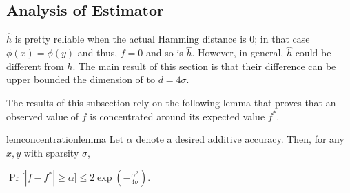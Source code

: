 \subsection{Analysis of Estimator}\label{subsec:analysis}

$\hat{h}$ is pretty reliable when the actual Hamming distance is 0; in that case 
$\phi(x)=\phi(y)$ and thus, $f=0$ and so is $\hat{h}$.
%
However, in general, $\hat{h}$ could be different from $h$. %
The main result of this section is that their difference can be upper bounded  the dimension of \fsketch to $d=4\sigma$.

The results of this subsection rely on the following lemma that proves that an observed value of $f$ is concentrated around its expected value $f^*$.

\begin{restatable}{lem}{concentrationlemma}
\label{lem:concentration}Let $\alpha$ denote a desired additive accuracy. Then, for any $x,y$ with sparsity $\sigma$,\\
    \centerline{$\displaystyle \Pr\Big[|f - f^*| \ge \alpha\Big] \le 2\exp{(-\tfrac{\alpha^2}{4\sigma})}$.}
\end{restatable}




